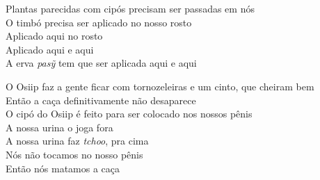 \bigskip

\begin{linenumbers}\begingroup\raggedright
 
\noindent  Plantas parecidas com cipós precisam ser passadas em nós\\
 O timbó precisa ser aplicado no nosso rosto\\
 Aplicado aqui no rosto\\
 Aplicado aqui e aqui\\
 A erva \emph{pasỹ} tem que ser aplicada aqui e aqui
 
\end{linenumbers}\endgroup

\bigskip

\begin{linenumbers}\begingroup\raggedright
 
\noindent  O Osiip faz a gente ficar com tornozeleiras e um cinto, que cheiram bem\\
 Então a caça definitivamente não desaparece\\
 O cipó do Osiip é feito para ser colocado nos nossos pênis\\
 A nossa urina o joga fora\\
 A nossa urina faz \emph{tchoo}, pra cima\\
 Nós não tocamos no nosso pênis\\
 Então nós matamos a caça
 
\end{linenumbers}\endgroup

\bigskip

